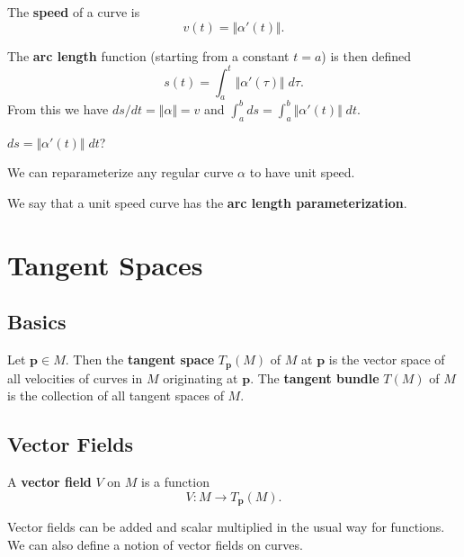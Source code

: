 \documentclass[10pt]{report}
\begin{document}
The \textbf{speed} of a curve is
\[
	v(t) = \Vert{\alpha'(t)}\Vert.
\] 

The \textbf{arc length} function (starting from a constant $t=a$) is then defined
\[
	s(t) = \int_{a}^{t} \Vert{\alpha'(\tau)}\Vert\;d\tau.
\] 
From this we have $ds/dt = \Vert{\alpha}\Vert=v$ and $\int_{a}^{b} ds = \int_{a}^{b} \Vert{\alpha'(t)}\Vert\;dt$.

{\color{red}$ds = \Vert{\alpha'(t)}\Vert\;dt$?}

\begin{thrm}[]
We can reparameterize any regular curve $\alpha$ to have unit speed.
\end{thrm}

We say that a unit speed curve has the \textbf{arc length parameterization}.


\chapter{Tangent Spaces}


\section{Basics}

\begin{defn}
	Let $\mathbf{p} \in M$. Then the \textbf{tangent space} $T_\mathbf{p}(M)$ of $M$ at $\mathbf{p}$ is the vector space of all velocities of curves in $M$ originating at $\mathbf{p}$. The \textbf{tangent bundle} $T( M)$ of $M$ is the collection of all tangent spaces of $M$.
\end{defn}


\section{Vector Fields}

\begin{defn}
	A \textbf{vector field} $V$ on $M$ is a function
	\[
		V:M \to T_{\mathbf{p}}(M).
	\] 
\end{defn}

Vector fields can be added and scalar multiplied in the usual way for functions. We can also define a notion of vector fields on curves.
\end{document}
